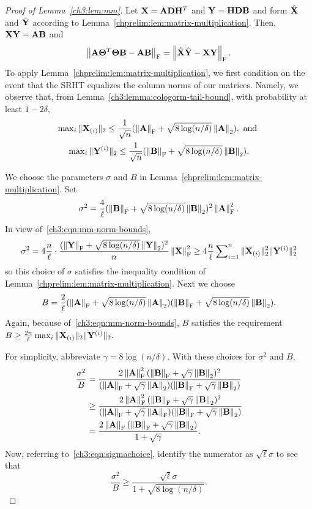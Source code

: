 \begin{proof}[Proof of Lemma~\ref{ch3:lem:mm}]
 Let $\mathbf{X} = \mathbf{A} \mathbf{D} \mathbf{H}^T$ and $\mathbf{Y} = \mathbf{H} \mathbf{D} \mathbf{B}$ and 
 form $\hat{\mathbf{X}}$ and $\hat{\mathbf{Y}}$ according to 
 Lemma~\ref{chprelim:lem:matrix-multiplication}. Then, $\mathbf{X} \mathbf{Y} = \mathbf{A} \mathbf{B}$ and
\[
 \left\|\mathbf{A} \mathbf{\Theta}^T \mathbf{\Theta} \mathbf{B} - \mathbf{A} \mathbf{B}\right\|_\mathrm{F} = \left\|\hat{\mathbf{X}} \hat{\mathbf{Y}} - \mathbf{X} \mathbf{Y}\right\|_\mathrm{F}.
\]
To apply Lemma~\ref{chprelim:lem:matrix-multiplication}, we first condition on
the event that the SRHT equalizes the column norms of our matrices. Namely, 
we observe that, from Lemma~\ref{ch3:lemma:cologorm-tail-bound}, with probability
at least $1 - 2\delta,$
\begin{gather}
 \label{ch3:eqn:mm-norm-bounds}
 \max\nolimits_i \|\mathbf{X}_{(i)}\|_2 \leq \frac{1}{\sqrt{n}} (\left\|\mathbf{A}\right\|_\mathrm{F} + \sqrt{8 \log(n/\delta)} \left\|\mathbf{A}\right\|_2), \text{ and } \\
 \max\nolimits_i \|\mathbf{Y}^{(i)}\|_2 \leq \frac{1}{\sqrt{n}} (\left\|\mathbf{B}\right\|_\mathrm{F} + \sqrt{8 \log(n/\delta)}\left\|\mathbf{B}\right\|_2). \notag
\end{gather}

We choose the parameters $\sigma$ and 
$B$ in Lemma~\ref{chprelim:lem:matrix-multiplication}. Set
\begin{equation}
\label{ch3:eqn:sigmachoice}
\sigma^2 = \frac{4}{\ell} (\left\|\mathbf{B}\right\|_\mathrm{F} + \sqrt{8 \log(n/\delta)}\left\|\mathbf{B}\right\|_2)^2 \left\|\mathbf{A}\right\|_\mathrm{F}^2.
\end{equation}
In view of~\eqref{ch3:eqn:mm-norm-bounds},
\[
 \sigma^2 = 4 \frac{n}{\ell} \cdot \frac{(\left\|\mathbf{Y}\right\|_\mathrm{F} + \sqrt{8 \log(n/\delta)}
 \left\|\mathbf{Y}\right\|_2)^2}{n} \left\|\mathbf{X}\right\|_\mathrm{F}^2 \geq 4 \frac{n}{\ell} \sum\nolimits_{i=1}^n 
 \|\mathbf{X}_{(i)}\|_2^2 \|\mathbf{Y}^{(i)}\|_2^2
\]
so this choice of $\sigma$ satisfies the inequality condition of 
Lemma~\ref{chprelim:lem:matrix-multiplication}. Next we choose
\[
 B = \frac{2}{\ell}(\left\|\mathbf{A}\right\|_\mathrm{F} + \sqrt{8 \log(n/\delta)} 
 \left\|\mathbf{A}\right\|_2)(\left\|\mathbf{B}\right\|_\mathrm{F} + \sqrt{8 \log(n/\delta)} \left\|\mathbf{B}\right\|_2).
\]
Again, because of~\eqref{ch3:eqn:mm-norm-bounds}, $B$ satisfies the 
requirement $B \geq \frac{2 n}{\ell}\max_i \|\mathbf{X}_{(i)}\|_2 \|\mathbf{Y}^{(i)}\|_2.$

For simplicity, abbreviate $\gamma = 8\log(n/\delta).$ With these choices for $\sigma^2$ and $B,$
\begin{align*}
 \frac{\sigma^2}{B} & = \frac{ 2 \left\|\mathbf{A}\right\|_\mathrm{F}^2 (\left\|\mathbf{B}\right\|_\mathrm{F} + \sqrt{\gamma} 
 \left\|\mathbf{B}\right\|_2)^2 }{ (\left\|\mathbf{A}\right\|_\mathrm{F} + \sqrt{\gamma} \left\|\mathbf{A}\right\|_2) 
  (\left\|\mathbf{B}\right\|_\mathrm{F} + \sqrt{\gamma} \left\|\mathbf{B}\right\|_2)} \\
 & \geq \frac{ 2 \left\|\mathbf{A}\right\|_\mathrm{F}^2 (\left\|\mathbf{B}\right\|_\mathrm{F} + 
 \sqrt{\gamma} \left\|\mathbf{B}\right\|_2)^2 }{ (\left\|\mathbf{A}\right\|_\mathrm{F} + 
 \sqrt{\gamma} \left\|\mathbf{A}\right\|_\mathrm{F}) (\left\|\mathbf{B}\right\|_\mathrm{F} + \sqrt{\gamma} \left\|\mathbf{B}\right\|_2)} \\
 & = \frac{2 \left\|\mathbf{A}\right\|_\mathrm{F}(\left\|\mathbf{B}\right\|_\mathrm{F} + \sqrt{\gamma}
  \left\|\mathbf{B}\right\|_2)}{1 + \sqrt{\gamma}}.
\end{align*}
Now, referring to~\eqref{ch3:eqn:sigmachoice}, identify the numerator as 
$\sqrt{\ell}\sigma$ to see that
\[
 \frac{\sigma^2}{B} \geq \frac{\sqrt{\ell} \sigma}{1+ \sqrt{8 \log(n/\delta)}}.
\]


\end{proof}
